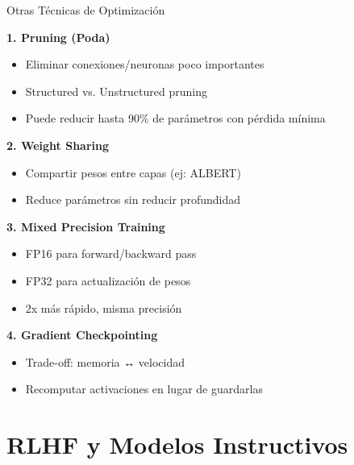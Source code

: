 \begin{frame}{Otras Técnicas de Optimización}

\textbf{1. Pruning (Poda)}
\begin{itemize}
    \item Eliminar conexiones/neuronas poco importantes
    \item Structured vs. Unstructured pruning
    \item Puede reducir hasta 90\% de parámetros con pérdida mínima
\end{itemize}

\vspace{0.5em}

\textbf{2. Weight Sharing}
\begin{itemize}
    \item Compartir pesos entre capas (ej: ALBERT)
    \item Reduce parámetros sin reducir profundidad
\end{itemize}

\vspace{0.5em}

\textbf{3. Mixed Precision Training}
\begin{itemize}
    \item FP16 para forward/backward pass
    \item FP32 para actualización de pesos
    \item 2x más rápido, misma precisión
\end{itemize}

\vspace{0.5em}

\textbf{4. Gradient Checkpointing}
\begin{itemize}
    \item Trade-off: memoria ↔ velocidad
    \item Recomputar activaciones en lugar de guardarlas
\end{itemize}

\end{frame}

\section{RLHF y Modelos Instructivos}

